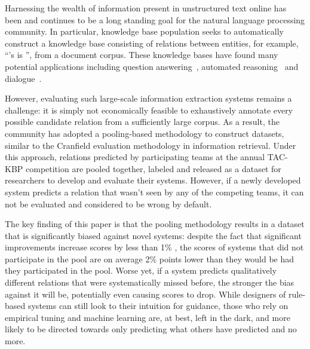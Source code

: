 Harnessing the wealth of information present in unstructured text online has been and continues to be a long standing goal for the natural language processing community.
In particular, knowledge base population seeks to automatically construct a knowledge base consisting of relations between entities, for example, ``'s  is '', from a document corpus. 
These knowledge bases have found many potential applications including question answering~\citep{berant2013freebase, fader2014open,reddy2014large}, automated reasoning~\citep{kalyanpur2012structured} and dialogue~\citep{lee2015conversational,han2015exploiting}.

However, evaluating such large-scale information extraction systems remains a challenge:
it is simply not economically feasible to exhaustively annotate every possible candidate relation from a sufficiently large corpus.
As a result, the community has adopted a pooling-based methodology to construct datasets, similar to the Cranfield evaluation methodology in information retrieval.
Under this approach, relations predicted by participating teams at the annual TAC-KBP competition are pooled together, labeled and released as a dataset for researchers to develop and evaluate their systems.
However, if a newly developed system predicts a relation that wasn't seen by any of the competing teams, it can not be evaluated and considered to be wrong by default. 

The key finding of this paper is that the pooling methodology results in a dataset that is significantly biased against novel systems: 
despite the fact that significant improvements increase scores by less than 1\% \fone{},
the \fone{} scores of systems that did not participate in the pool are on average 2\% points lower than they would be had they participated in the pool.
Worse yet, if a system predicts qualitatively different relations that were systematically missed before, the stronger the bias against it will be, potentially even causing scores to drop.
While designers of rule-based systems can still look to their intuition for guidance, those who rely on empirical tuning and machine learning are, at best, left in the dark, and more likely to be directed towards only predicting what others have predicted and no more.

